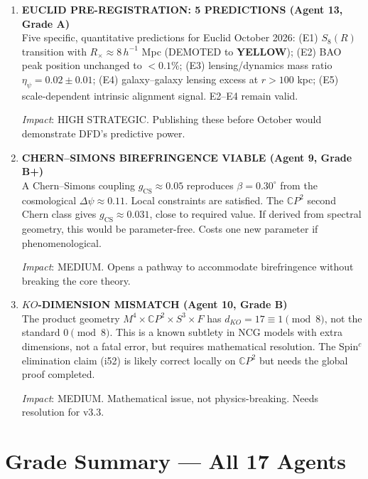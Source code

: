 \documentclass[11pt,a4paper]{article}
\newcommand{\YELLOW}{\textcolor{dfdyellow}{\textbf{YELLOW}}}
\newcommand{\CP}{\mathbb{C}P}
\begin{document}
\begin{enumerate}[label=\textbf{\arabic*.}, leftmargin=1.5cm]
\textit{Impact}: MEDIUM. Tightens the assessment. DFD is safe but not comfortable.

\item \textbf{EUCLID PRE-REGISTRATION: 5 PREDICTIONS (Agent 13, Grade A)}\\
Five specific, quantitative predictions for Euclid October 2026: (E1) $S_8(R)$ transition with $R_\times \approx 8\,h^{-1}$ Mpc (DEMOTED to \YELLOW); (E2) BAO peak position unchanged to $< 0.1\%$; (E3) lensing/dynamics mass ratio $\eta_\psi = 0.02 \pm 0.01$; (E4) galaxy--galaxy lensing excess at $r > 100$ kpc; (E5) scale-dependent intrinsic alignment signal. E2--E4 remain valid.

\textit{Impact}: HIGH STRATEGIC. Publishing these before October would demonstrate DFD's predictive power.

\item \textbf{CHERN--SIMONS BIREFRINGENCE VIABLE (Agent 9, Grade B+)}\\
A Chern--Simons coupling $g_{\mathrm{CS}} \approx 0.05$ reproduces $\beta = 0.30^\circ$ from the cosmological $\Delta\psi \approx 0.11$. Local constraints are satisfied. The $\CP^2$ second Chern class gives $g_{\mathrm{CS}} \approx 0.031$, close to required value. If derived from spectral geometry, this would be parameter-free. Costs one new parameter if phenomenological.

\textit{Impact}: MEDIUM. Opens a pathway to accommodate birefringence without breaking the core theory.

\item \textbf{$KO$-DIMENSION MISMATCH (Agent 10, Grade B)}\\
The product geometry $M^4 \times \CP^2 \times S^3 \times F$ has $d_{KO} = 17 \equiv 1 \pmod{8}$, not the standard $0 \pmod{8}$. This is a known subtlety in NCG models with extra dimensions, not a fatal error, but requires mathematical resolution. The Spin$^c$ elimination claim (i52) is likely correct locally on $\CP^2$ but needs the global proof completed.

\textit{Impact}: MEDIUM. Mathematical issue, not physics-breaking. Needs resolution for v3.3.
\end{enumerate}


\section{Grade Summary --- All 17 Agents}
\label{sec:grades}
\end{document}
